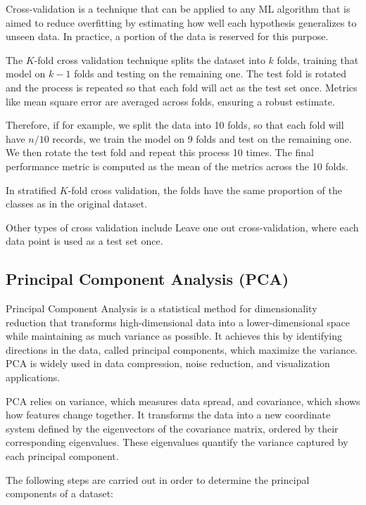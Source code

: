 		Cross-validation\cite{geron2022hands} is a technique that can be applied to any ML algorithm that is aimed to reduce overfitting by estimating how well each hypothesis generalizes to unseen data. In practice, a portion of the data is reserved for this purpose.
		
		The $K$-fold cross validation technique splits the dataset into $k$ folds, training that model on $k-1$ folds and testing on the remaining one. The test fold is rotated and the process is repeated so that each fold will act as the test set once. Metrics like mean square error are averaged across folds, ensuring a robust estimate.
		
		Therefore, if for example, we split the data into 10 folds, so that each fold will have $n/10$ records, we train the model on 9 folds and test on the remaining one. We then rotate the test fold and repeat this process 10 times. The final performance metric is computed as the mean of the metrics across the 10 folds.
		
		In stratified $K$-fold cross validation, the folds have the same proportion of the classes as in the original dataset.
		
		Other types of cross validation include Leave one out cross-validation, where each data point is used as a test set once.
	
	
	
	\subsection{Principal Component Analysis (PCA)}
	
		Principal Component Analysis\cite{shlens2014tutorial} is a statistical method for dimensionality reduction that transforms high-dimensional data into a lower-dimensional space while maintaining as much variance as possible. It achieves this by identifying directions in the data, called principal components, which maximize the variance. PCA is widely used in data compression, noise reduction, and visualization applications. 
		
		PCA relies on variance, which measures data spread, and covariance, which shows how features change together. It transforms the data into a new coordinate system defined by the eigenvectors of the covariance matrix, ordered by their corresponding eigenvalues. These eigenvalues quantify the variance captured by each principal component.
		
		The following steps are carried out in order to determine the principal components of a dataset:
		
